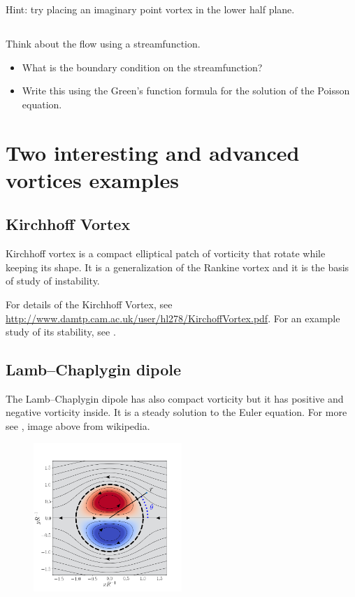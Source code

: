 \documentclass[11pt,letterpaper]{article}
\begin{document}
Hint: try placing an imaginary point vortex in the lower half plane.

\subsection{}
Think about the flow using a streamfunction. 
\begin{itemize}
    \item What is the boundary condition on the streamfunction? 
    \item Write this using the Green's function formula for the solution of the Poisson equation.
\end{itemize}

\section{Two interesting and advanced vortices examples}
\subsection{Kirchhoff Vortex} Kirchhoff vortex is a compact elliptical patch of vorticity that rotate while keeping its shape. It is a generalization of the Rankine vortex and it is the basis of study of instability. 

For details of the Kirchhoff Vortex, see \url{http://www.damtp.cam.ac.uk/user/hl278/KirchoffVortex.pdf}. For an example study of its stability, see \cite{MitchellRossi_08}.

\subsection{Lamb–Chaplygin dipole} The Lamb–Chaplygin dipole has also compact vorticity but it has positive and negative vorticity inside. It is a steady solution to the Euler equation. For more see \cite{MeleshkoHeijst_94}, image above from wikipedia.
\begin{figure}
    \centering
    \includegraphics[width = 0.5\textwidth]{figs/Lamb-Chaplygin_dipole.png}
\end{figure}

    
\vfill
\printbibliography
\end{document}
